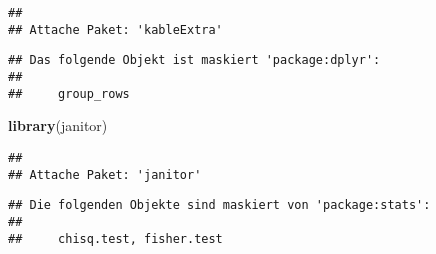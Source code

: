 \documentclass[
]{article}
\newenvironment{Shaded}{\begin{snugshade}}{\end{snugshade}}
\newcommand{\FunctionTok}[1]{\textcolor[rgb]{0.13,0.29,0.53}{\textbf{#1}}}
\newcommand{\NormalTok}[1]{#1}
\begin{document}
\begin{verbatim}
## 
## Attache Paket: 'kableExtra'
\end{verbatim}

\begin{verbatim}
## Das folgende Objekt ist maskiert 'package:dplyr':
## 
##     group_rows
\end{verbatim}

\begin{Shaded}
\begin{Highlighting}[]
\FunctionTok{library}\NormalTok{(janitor)}
\end{Highlighting}
\end{Shaded}

\begin{verbatim}
## 
## Attache Paket: 'janitor'
\end{verbatim}

\begin{verbatim}
## Die folgenden Objekte sind maskiert von 'package:stats':
## 
##     chisq.test, fisher.test
\end{verbatim}
\end{document}
